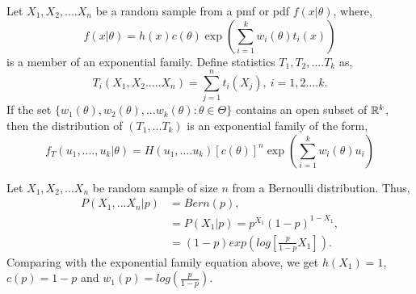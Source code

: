 \documentclass[a4paper,english,12pt]{article}
\begin{document}
\begin{thm}
Let $X_1,X_2,....X_n$ be a random sample from a pmf or pdf $f(x|\theta)$, where,
\begin{equation*}
f(x|\theta)=h(x)c(\theta)\exp\left(\sum_{i=1}^{k}w_i(\theta)t_i(x)\right)
\end{equation*} 
is a member of an exponential family. Define statistics $T_1,T_2,....T_k$ as,
\begin{equation*}
T_i(X_1,X_2.....X_n)=\sum_{j=1}^{n}t_i(X_j),  ~i=1,2....k.
\end{equation*} 
If the set $\{w_1(\theta),w_2(\theta),...w_k(\theta):\theta\in\Theta\}$ contains an open subset of $\mathbb{R}^k$, then the distribution of $(T_1,...T_k)$ is an exponential family of the form,
\begin{equation*}
f_T(u_1,....,u_k|\theta)=H(u_1,....u_k)[c(\theta)]^n \exp\left(\sum_{i=1}^kw_i(\theta)u_i\right)
\end{equation*} 
\end{thm}
\begin{exmp}
Let $X_1,X_2,...X_n$ be random sample of size $n$ from a Bernoulli distribution. Thus, 
\begin{align}
P(X_1,...X_n|p)&=Bern(p),   \nonumber  \\
&=P(X_1|p)=p^{X_1}(1-p)^{1-X_1}, \nonumber \\
&=(1-p)exp\left(log\left[\frac{p}{1-p}X_1\right]\right).
\end{align}
Comparing with the exponential family equation above, we get $h(X_1)=1$,  $c(p)=1-p$ and $w_1(p)=log(\frac{p}{1-p})$.
\end{exmp}
\end{document}
